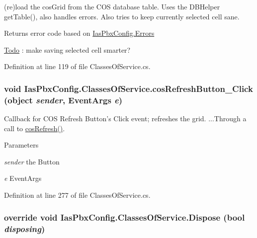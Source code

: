 (re)load the cosGrid from the COS database table. Uses the DBHelper getTable(), also handles errors. Also tries to keep currently selected cell sane. \begin{DoxyReturn}{Returns}
error code based on \hyperlink{namespace_ias_pbx_config_afbeaf23ebc85892dc4c2cb09f7f2a0cb}{IasPbxConfig.Errors} 
\end{DoxyReturn}
\begin{Desc}
\item[\hyperlink{todo__todo000002}{Todo}]: make saving selected cell smarter? \end{Desc}


Definition at line 119 of file ClassesOfService.cs.\hypertarget{class_ias_pbx_config_1_1_classes_of_service_a5486a88fb21ad0789ddf5f1388a9b716}{
\subsubsection[{cosRefreshButton\_\-Click}]{\setlength{\rightskip}{0pt plus 5cm}void IasPbxConfig.ClassesOfService.cosRefreshButton\_\-Click (object {\em sender}, \/  EventArgs {\em e})}}
\label{class_ias_pbx_config_1_1_classes_of_service_a5486a88fb21ad0789ddf5f1388a9b716}


Callback for COS Refresh Button's Click event; refreshes the grid. ...Through a call to \hyperlink{class_ias_pbx_config_1_1_classes_of_service_ade0a8c01686723c46356a0118b50cb8a}{cosRefresh()}. 
\begin{DoxyParams}{Parameters}
\item[{\em sender}]the Button \item[{\em e}]EventArgs \end{DoxyParams}


Definition at line 277 of file ClassesOfService.cs.\hypertarget{class_ias_pbx_config_1_1_classes_of_service_af549a6af675cf68b774598a0b26f3070}{
\subsubsection[{Dispose}]{\setlength{\rightskip}{0pt plus 5cm}override void IasPbxConfig.ClassesOfService.Dispose (bool {\em disposing})}}
\label{class_ias_pbx_config_1_1_classes_of_service_af549a6af675cf68b774598a0b26f3070}


